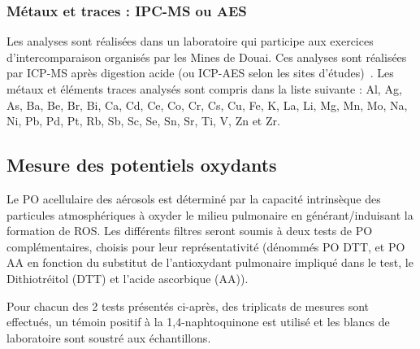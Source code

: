 
\subsubsection{Métaux et traces : IPC-MS ou AES}%
\label{ssub:métaux_et_traces}

Les analyses sont réalisées dans un laboratoire qui
participe aux exercices d’intercomparaison organisés par les Mines de Douai. Ces analyses
sont réalisées par ICP-MS après digestion acide (ou ICP-AES selon les sites
d'études)~\autocite{allemanPM102010,mbengueSizedistributed2014,cenAmbient2005}.
Les métaux et éléments traces analysés sont compris dans la liste suivante : Al, Ag, As,
Ba, Be, Br, Bi, Ca, Cd, Ce, Co, Cr, Cs, Cu, Fe, K, La, Li, Mg, Mn, Mo, Na, Ni, Pb, Pd, Pt,
Rb, Sb, Sc, Se, Sn, Sr, Ti, V, Zn et Zr.

\subsection{Mesure des potentiels oxydants}%
\label{sub:potentiels_oxydants}

Le PO acellulaire des aérosols est déterminé par la capacité intrinsèque des particules
atmosphériques à oxyder le milieu pulmonaire en générant/induisant la formation de ROS.
Les différents filtres seront soumis à deux tests de PO complémentaires, choisis pour
leur représentativité (dénommés PO DTT, et PO AA en fonction du substitut de
l’antioxydant pulmonaire impliqué dans le test, le Dithiotréitol (DTT) et l’acide
ascorbique (AA)). 

Pour chacun des 2 tests présentés ci-après, des triplicats de mesures sont effectués, un
témoin positif à la 1,4-naphtoquinone est utilisé et les blancs de laboratoire sont
soustré aux échantillons.

